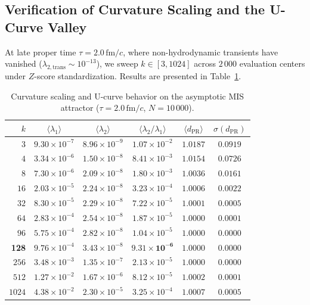 \documentclass[11pt,a4paper]{article}
\begin{document}
\subsection{Verification of Curvature Scaling and the U-Curve Valley}
At late proper time $\tau = 2.0\,\mathrm{fm}/c$, where non-hydrodynamic transients have vanished ($\lambda_{2,\mathrm{trans}} \sim 10^{-13}$), we sweep $k \in [3, 1024]$ across $2\,000$ evaluation centers under $Z$-score standardization. Results are presented in Table~\ref{tab:test2_results}.

\begin{table}[htbp]
    \centering
    \caption{Curvature scaling and U-curve behavior on the asymptotic MIS attractor ($\tau = 2.0\,\mathrm{fm}/c$, $N = 10\,000$).}
    \label{tab:test2_results}
    \vspace{0.4em}
    \begin{tabular}{@{}r c c c c c@{}}
        \toprule
        $k$ & $\langle \lambda_1 \rangle$ & $\langle \lambda_2 \rangle$ & $\langle \lambda_2/\lambda_1 \rangle$ & $\langle d_{\mathrm{PR}} \rangle$ & $\sigma(d_{\mathrm{PR}})$ \\
        \midrule
        $3$ & $9.30\times 10^{-7}$ & $8.96\times 10^{-9}$ & $1.07\times 10^{-2}$ & $1.0187$ & $0.0919$ \\
        $4$ & $3.34\times 10^{-6}$ & $1.50\times 10^{-8}$ & $8.41\times 10^{-3}$ & $1.0154$ & $0.0726$ \\
        $8$ & $7.30\times 10^{-6}$ & $2.09\times 10^{-8}$ & $1.80\times 10^{-3}$ & $1.0036$ & $0.0161$ \\
        $16$ & $2.03\times 10^{-5}$ & $2.24\times 10^{-8}$ & $3.23\times 10^{-4}$ & $1.0006$ & $0.0022$ \\
        $32$ & $8.30\times 10^{-5}$ & $2.29\times 10^{-8}$ & $7.22\times 10^{-5}$ & $1.0001$ & $0.0005$ \\
        $64$ & $2.83\times 10^{-4}$ & $2.54\times 10^{-8}$ & $1.87\times 10^{-5}$ & $1.0000$ & $0.0001$ \\
        $96$ & $5.75\times 10^{-4}$ & $2.82\times 10^{-8}$ & $1.04\times 10^{-5}$ & $1.0000$ & $0.0000$ \\
        \textbf{128} & $9.76\times 10^{-4}$ & $3.43\times 10^{-8}$ & $\mathbf{9.31\times 10^{-6}}$ & $\mathbf{1.0000}$ & $\mathbf{0.0000}$ \\
        $256$ & $3.48\times 10^{-3}$ & $1.35\times 10^{-7}$ & $2.13\times 10^{-5}$ & $1.0000$ & $0.0000$ \\
        $512$ & $1.27\times 10^{-2}$ & $1.67\times 10^{-6}$ & $8.12\times 10^{-5}$ & $1.0002$ & $0.0001$ \\
        $1024$ & $4.38\times 10^{-2}$ & $2.30\times 10^{-5}$ & $3.25\times 10^{-4}$ & $1.0007$ & $0.0005$ \\
        \bottomrule
    \end{tabular}
\end{table}
\end{document}
